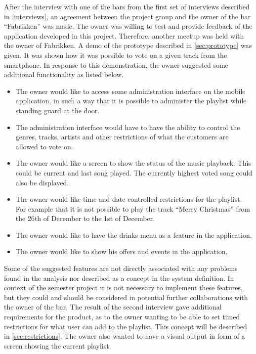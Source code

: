 \label{sec:fabrikken}
After the interview with one of the bars from the first set of interviews described in \cref{interviews}, an agreement between the project group and the owner of the bar \enquote{Fabrikken} was made. The owner was willing to test and provide feedback of the application developed in this project. Therefore, another meetup was held with the owner of Fabrikken. A demo of the prototype described in \cref{sec:prototype} was given. It was shown how it was possible to vote on a given track from the smartphone. In response to this demonstration, the owner suggested some additional functionality as listed below.

\begin{itemize}
    \item{The owner would like to access some administration interface on the mobile application, in such a way that it is possible to administer the playlist while standing guard at the door.}
    \item{The administration interface would have to have the ability to control the genres, tracks, artists and other restrictions of what the customers are allowed to vote on.}
    \item{The owner would like a screen to show the status of the music playback. This could be current and last song played. The currently highest voted song could also be displayed.}
    \item{The owner would like time and date controlled restrictions for the playlist. For example that it is not possible to play the track \enquote{Merry Christmas} from the 26th of December to the 1st of December.}
    \item{The owner would like to have the drinks menu as a feature in the application.}
    \item{The owner would like to show his offers and events in the application.}
\end{itemize}

Some of the suggested features are not directly associated with any
problems found in the analysis nor described as a concept in the
system definition. In context of the semester project it is not
necessary to implement these features, but they could and should be
considered in potential further collaborations with the owner of the
bar. The result of the second interview gave additional requirements
for the product, as to the owner wanting to be able to set timed
restrictions for what user can add to the playlist. This concept will
be described in \cref{sec:restrictions}. The owner also wanted to have
a visual output in form of a screen showing the current playlist.
